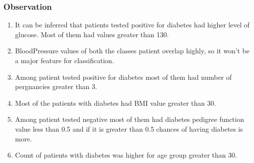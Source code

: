 \documentclass[12pt]{article}
\begin{document}
\subsubsection{Observation}

\begin{enumerate}
\item It can be inferred that patients tested positive for diabetes had higher level of glucose. Most of them had values greater than 130.
\item BloodPressure values of both the classes patient overlap highly, so it won't be a major feature for classification.
\item Among patient tested positive for diabetes most of them had number of pergnancies greater than 3.
\item Most of the patients with diabetes had BMI value greater than 30.
\item Among patient tested negative most of them had diabetes pedigree function value less than 0.5 and if it is greater than 0.5 chances of having diabetes is more.
\item Count of patients with diabetes was higher for age group greater than 30.
\end{enumerate}
\end{document}
